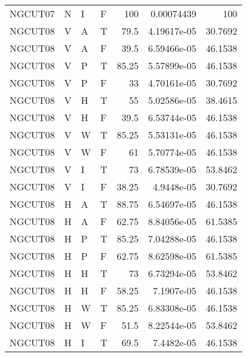 \begin{longtable}{llllrrr}
    NGCUT07  & N         & I         & F          & 100        & 0.00074439  & 100      \\
    NGCUT08  & V         & A         & T          & 79.5       & 4.19617e-05 & 30.7692  \\
    NGCUT08  & V         & A         & F          & 39.5       & 6.59466e-05 & 46.1538  \\
    NGCUT08  & V         & P         & T          & 85.25      & 5.57899e-05 & 46.1538  \\
    NGCUT08  & V         & P         & F          & 33         & 4.70161e-05 & 30.7692  \\
    NGCUT08  & V         & H         & T          & 55         & 5.02586e-05 & 38.4615  \\
    NGCUT08  & V         & H         & F          & 39.5       & 6.53744e-05 & 46.1538  \\
    NGCUT08  & V         & W         & T          & 85.25      & 5.53131e-05 & 46.1538  \\
    NGCUT08  & V         & W         & F          & 61         & 5.70774e-05 & 46.1538  \\
    NGCUT08  & V         & I         & T          & 73         & 6.78539e-05 & 53.8462  \\
    NGCUT08  & V         & I         & F          & 38.25      & 4.9448e-05  & 30.7692  \\
    NGCUT08  & H         & A         & T          & 88.75      & 6.54697e-05 & 46.1538  \\
    NGCUT08  & H         & A         & F          & 62.75      & 8.84056e-05 & 61.5385  \\
    NGCUT08  & H         & P         & T          & 85.25      & 7.04288e-05 & 46.1538  \\
    NGCUT08  & H         & P         & F          & 62.75      & 8.62598e-05 & 61.5385  \\
    NGCUT08  & H         & H         & T          & 73         & 6.73294e-05 & 53.8462  \\
    NGCUT08  & H         & H         & F          & 58.25      & 7.1907e-05  & 46.1538  \\
    NGCUT08  & H         & W         & T          & 85.25      & 6.83308e-05 & 46.1538  \\
    NGCUT08  & H         & W         & F          & 51.5       & 8.22544e-05 & 53.8462  \\
    NGCUT08  & H         & I         & T          & 69.5       & 7.4482e-05  & 46.1538  \\

\end{longtable}
